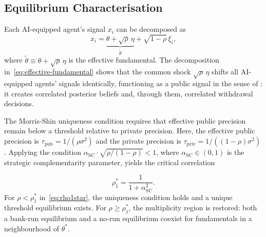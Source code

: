 \subsection{Equilibrium Characterisation}

Each AI-equipped agent's signal $x_i$ can be decomposed as
\begin{equation}\label{eq:effective-fundamental}
  x_i = \underbrace{\theta + \sqrt{\rho}\,\eta}_{\tilde{\theta}} + \sqrt{1-\rho}\,\xi_i,
\end{equation}
where $\tilde{\theta} \equiv \theta + \sqrt{\rho}\,\eta$ is the effective fundamental. The decomposition in~\eqref{eq:effective-fundamental} shows that the common shock $\sqrt{\rho}\,\eta$ shifts all AI-equipped agents' signals identically, functioning as a public signal in the sense of \citet{hellwig2002}: it creates correlated posterior beliefs and, through them, correlated withdrawal decisions.

The Morris-Shin uniqueness condition requires that effective public precision remain below a threshold relative to private precision. Here, the effective public precision is $\tau_{\text{pub}} = 1/(\rho\sigma^2)$ and the private precision is $\tau_{\text{priv}} = 1/((1-\rho)\sigma^2)$. Applying the \citet{morris2003} condition $\alpha_{\text{SC}} \cdot \sqrt{\rho/(1-\rho)} < 1$, where $\alpha_{\text{SC}} \in (0,1)$ is the strategic complementarity parameter, yields the critical correlation

\begin{equation}\label{eq:rho1star}
  \rho_1^* = \frac{1}{1 + \alpha_{\text{SC}}^2}.
\end{equation}
For $\rho < \rho_1^*$ in~\eqref{eq:rho1star}, the uniqueness condition holds and a unique threshold equilibrium exists. For $\rho \geq \rho_1^*$, the \citet{hellwig2002} multiplicity region is restored: both a bank-run equilibrium and a no-run equilibrium coexist for fundamentals in a neighbourhood of $\theta^*$.

